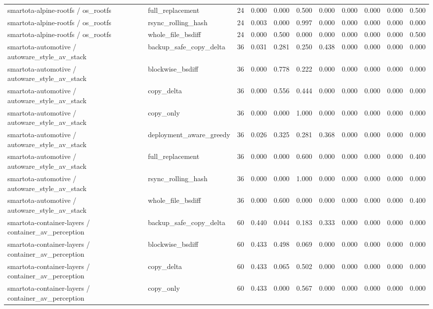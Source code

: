 \begin{table}
{\begin{tabular}{llrrrrrrrrr}
smartota-alpine-rootfs / os_rootfs & full_replacement & 24 & 0.000 & 0.000 & 0.500 & 0.000 & 0.000 & 0.000 & 0.000 & 0.500 \\
smartota-alpine-rootfs / os_rootfs & rsync_rolling_hash & 24 & 0.003 & 0.000 & 0.997 & 0.000 & 0.000 & 0.000 & 0.000 & 0.000 \\
smartota-alpine-rootfs / os_rootfs & whole_file_bsdiff & 24 & 0.000 & 0.500 & 0.000 & 0.000 & 0.000 & 0.000 & 0.000 & 0.500 \\
smartota-automotive / autoware_style_av_stack & backup_safe_copy_delta & 36 & 0.031 & 0.281 & 0.250 & 0.438 & 0.000 & 0.000 & 0.000 & 0.000 \\
smartota-automotive / autoware_style_av_stack & blockwise_bsdiff & 36 & 0.000 & 0.778 & 0.222 & 0.000 & 0.000 & 0.000 & 0.000 & 0.000 \\
smartota-automotive / autoware_style_av_stack & copy_delta & 36 & 0.000 & 0.556 & 0.444 & 0.000 & 0.000 & 0.000 & 0.000 & 0.000 \\
smartota-automotive / autoware_style_av_stack & copy_only & 36 & 0.000 & 0.000 & 1.000 & 0.000 & 0.000 & 0.000 & 0.000 & 0.000 \\
smartota-automotive / autoware_style_av_stack & deployment_aware_greedy & 36 & 0.026 & 0.325 & 0.281 & 0.368 & 0.000 & 0.000 & 0.000 & 0.000 \\
smartota-automotive / autoware_style_av_stack & full_replacement & 36 & 0.000 & 0.000 & 0.600 & 0.000 & 0.000 & 0.000 & 0.000 & 0.400 \\
smartota-automotive / autoware_style_av_stack & rsync_rolling_hash & 36 & 0.000 & 0.000 & 1.000 & 0.000 & 0.000 & 0.000 & 0.000 & 0.000 \\
smartota-automotive / autoware_style_av_stack & whole_file_bsdiff & 36 & 0.000 & 0.600 & 0.000 & 0.000 & 0.000 & 0.000 & 0.000 & 0.400 \\
smartota-container-layers / container_av_perception & backup_safe_copy_delta & 60 & 0.440 & 0.044 & 0.183 & 0.333 & 0.000 & 0.000 & 0.000 & 0.000 \\
smartota-container-layers / container_av_perception & blockwise_bsdiff & 60 & 0.433 & 0.498 & 0.069 & 0.000 & 0.000 & 0.000 & 0.000 & 0.000 \\
smartota-container-layers / container_av_perception & copy_delta & 60 & 0.433 & 0.065 & 0.502 & 0.000 & 0.000 & 0.000 & 0.000 & 0.000 \\
smartota-container-layers / container_av_perception & copy_only & 60 & 0.433 & 0.000 & 0.567 & 0.000 & 0.000 & 0.000 & 0.000 & 0.000 \\

\end{tabular}}
\end{table}
